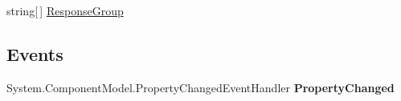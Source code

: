 \begin{DoxyCompactItemize}
\begin{DoxyCompactList}\small\item\em \end{DoxyCompactList}\item 
\hypertarget{class_price___comparison_1_1amazon_1_1ecs_1_1_cart_modify_request_a458233e0935c8fead044c0f7a8389557}{string\mbox{[}$\,$\mbox{]} \hyperlink{class_price___comparison_1_1amazon_1_1ecs_1_1_cart_modify_request_a458233e0935c8fead044c0f7a8389557}{Response\-Group}}\label{class_price___comparison_1_1amazon_1_1ecs_1_1_cart_modify_request_a458233e0935c8fead044c0f7a8389557}

\begin{DoxyCompactList}\small\item\em \end{DoxyCompactList}\end{DoxyCompactItemize}
\subsection*{Events}
\begin{DoxyCompactItemize}
\item 
\hypertarget{class_price___comparison_1_1amazon_1_1ecs_1_1_cart_modify_request_a22bb0039ac5132913e783cf13aa19b6e}{System.\-Component\-Model.\-Property\-Changed\-Event\-Handler {\bfseries Property\-Changed}}\label{class_price___comparison_1_1amazon_1_1ecs_1_1_cart_modify_request_a22bb0039ac5132913e783cf13aa19b6e}

\end{DoxyCompactItemize}
